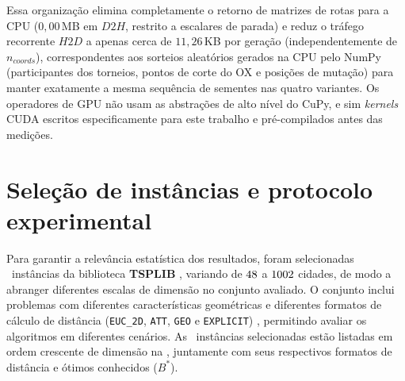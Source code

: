 \begin{enumerate}
            Essa organização elimina completamente o retorno de matrizes de rotas para a CPU (\(0{,}00\)\,MB em \(\mathit{D2H}\), restrito a escalares de parada) e reduz o tráfego recorrente \(\mathit{H2D}\) a apenas cerca de \(11{,}26\)\,KB por geração (independentemente de \(n_{coords}\)), correspondentes aos sorteios aleatórios gerados na CPU pelo NumPy (participantes dos torneios, pontos de corte do OX e posições de mutação) para manter exatamente a mesma sequência de sementes nas quatro variantes.
            Os operadores de GPU não usam as abstrações de alto nível do CuPy, e sim \emph{kernels} CUDA escritos especificamente para este trabalho e pré-compilados antes das medições.
\end{enumerate}

\section{Seleção de instâncias e protocolo experimental}\label{sec-33-selecao-instancias}

Para garantir a relevância estatística dos resultados, foram selecionadas \totalinstancias\ instâncias da biblioteca \textbf{TSPLIB} \autocite{reinelt1991tsplib}, variando de \(48\) a \(1002\) cidades, de modo a abranger diferentes escalas de dimensão no conjunto avaliado.
O conjunto inclui problemas com diferentes características geométricas e diferentes formatos de cálculo de distância (\texttt{EUC\_2D}, \texttt{ATT}, \texttt{GEO} e \texttt{EXPLICIT}) \autocite{reinelt1991tsplib}, permitindo avaliar os algoritmos em diferentes cenários.
As \totalinstancias\ instâncias selecionadas estão listadas em ordem crescente de dimensão na , juntamente com seus respectivos formatos de distância e ótimos conhecidos (\(B^*\)).

